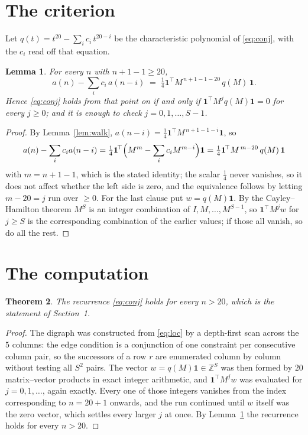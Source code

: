 \documentclass[11pt,a4paper]{article}
\theoremstyle{plain}
\newtheorem{theorem}{Theorem}
\newtheorem{lemma}[theorem]{Lemma}
\theoremstyle{definition}
\begin{document}
\section{The criterion}

Let $q(t)=t^{20}-\sum_i c_i\,t^{20-i}$ be the characteristic polynomial of
\eqref{eq:conj}, with the $c_i$ read off that equation.

\begin{lemma}\label{lem:crit}
For every $n$ with $n+1-1\ge20$,
\[
a(n)-\sum_i c_i\,a(n-i)\;=\;\tfrac1{4}\mathbf{1}^{\!\top}M^{\,n+1-1-20}\,q(M)\,\mathbf{1} .
\]
Hence \eqref{eq:conj} holds from that point on if and only if
$\mathbf{1}^{\!\top}M^{j}q(M)\mathbf{1}=0$ for every $j\ge0$; and it is enough to check
$j=0,1,\dots,S-1$.
\end{lemma}

\begin{proof}
By Lemma~\ref{lem:walk}, $a(n-i)=\tfrac1{4}\mathbf{1}^{\!\top}M^{\,n+1-1-i}\mathbf{1}$, so
\[
a(n)-\sum_i c_i a(n-i)
=\tfrac1{4}\mathbf{1}^{\!\top}\Bigl(M^{m}-\sum_i c_i M^{m-i}\Bigr)\mathbf{1}
=\tfrac1{4}\mathbf{1}^{\!\top}M^{\,m-20}\,q(M)\,\mathbf{1}
\]
with $m=n+1-1$, which is the stated identity; the scalar $\tfrac1{4}$ never vanishes, so it does not affect whether the left side is zero, and the equivalence follows by letting
$m-20=j$ run over $\ge0$. For the last clause put $w=q(M)\mathbf{1}$. By the
Cayley--Hamilton theorem $M^{S}$ is an integer combination of $I,M,\dots,M^{S-1}$, so
$\mathbf{1}^{\!\top}M^{j}w$ for $j\ge S$ is the corresponding combination of the earlier
values; if those all vanish, so do all the rest.
\end{proof}

\section{The computation}

\begin{theorem}
The recurrence \eqref{eq:conj} holds for every $n>20$, which is the statement of
Section~1.
\end{theorem}

\begin{proof}
The digraph was constructed from \eqref{eq:loc} by a depth-first scan across the $5$
columns: the edge condition is a conjunction of one constraint per consecutive column
pair, so the successors of a row $r$ are enumerated column by column without testing all
$S^2$ pairs. The vector $w=q(M)\mathbf{1}\in\mathbb{Z}^{S}$ was then formed by $20$
matrix--vector products in exact integer arithmetic, and $\mathbf{1}^{\!\top}M^{j}w$ was
evaluated for $j=0,1,\dots$, again exactly. Every one of those integers vanishes from the
index corresponding to $n=20+1$ onwards, and the run continued until $w$ itself was the
zero vector, which settles every larger $j$ at once. By Lemma~\ref{lem:crit} the recurrence
holds for every $n>20$.
\end{proof}
\end{document}
